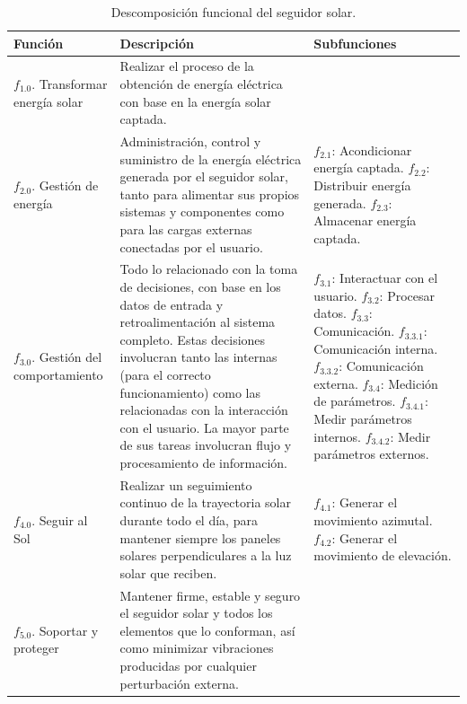\begin{table}[H]
	\centering
	\caption{Descomposición funcional del seguidor solar.}
	\begin{tabular}{@{}|p{2.5cm}|p{5.5cm}|p{4.5cm}|} 
		\hline
		\textbf{Función} & \textbf{Descripción} & \textbf{Subfunciones}  \\
		\hline \hline
		$ f_{1.0} $. Transformar energía solar & Realizar el proceso de la obtención de energía eléctrica con base en la energía solar captada. &  \\ \hline
		$ f_{2.0} $. Gestión de energía & Administración, control y suministro de la energía eléctrica generada por el seguidor solar, tanto para alimentar sus propios sistemas y componentes como para las cargas externas conectadas por el usuario. & $ f_{2.1} $: Acondicionar energía captada.\newline{} $ f_{2.2} $: Distribuir energía generada.\newline{} $ f_{2.3} $: Almacenar energía captada.
	 	\\ \hline
		$ f_{3.0} $. Gestión del comportamiento & Todo lo relacionado con la toma de decisiones, con base en los datos de entrada y retroalimentación al sistema completo. Estas decisiones involucran tanto las internas (para el correcto funcionamiento) como las relacionadas con la interacción con el usuario.	La mayor parte de sus tareas involucran flujo y procesamiento de información. & $ f_{3.1} $: Interactuar con el usuario.\newline{} $ f_{3.2} $: Procesar datos.\newline{} $ f_{3.3} $: Comunicación.\newline{}	$ f_{3.3.1} $: Comunicación interna.\newline{} $ f_{3.3.2} $: Comunicación externa.\newline{} $ f_{3.4} $: Medición de parámetros.\newline{} $ f_{3.4.1} $: Medir parámetros internos.\newline{}	$ f_{3.4.2} $: Medir parámetros externos.
	 	\\ \hline
		$ f_{4.0} $. Seguir al Sol & Realizar un seguimiento continuo de la trayectoria solar durante todo el día, para mantener siempre los paneles solares perpendiculares a la luz solar que reciben. & $ f_{4.1} $: Generar el movimiento azimutal.\newline{} $ f_{4.2} $: Generar el movimiento de elevación.
	 	\\ \hline
		$ f_{5.0} $. Soportar y proteger & Mantener firme, estable y seguro el seguidor solar y todos los elementos que lo conforman, así como minimizar vibraciones producidas por cualquier perturbación externa. & 
		 \\ \hline
	\end{tabular}	
	\label{tabla:function}
\end{table}

